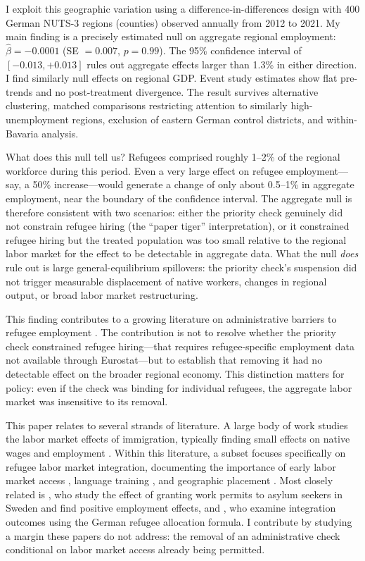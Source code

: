 \documentclass[12pt]{article}
\begin{document}
I exploit this geographic variation using a difference-in-differences design with 400 German NUTS-3 regions (counties) observed annually from 2012 to 2021. My main finding is a precisely estimated null on aggregate regional employment: $\hat{\beta} = -0.0001$ (SE $= 0.007$, $p = 0.99$). The 95\% confidence interval of $[-0.013, +0.013]$ rules out aggregate effects larger than 1.3\% in either direction. I find similarly null effects on regional GDP. Event study estimates show flat pre-trends and no post-treatment divergence. The result survives alternative clustering, matched comparisons restricting attention to similarly high-unemployment regions, exclusion of eastern German control districts, and within-Bavaria analysis.

What does this null tell us? Refugees comprised roughly 1--2\% of the regional workforce during this period. Even a very large effect on refugee employment---say, a 50\% increase---would generate a change of only about 0.5--1\% in aggregate employment, near the boundary of the confidence interval. The aggregate null is therefore consistent with two scenarios: either the priority check genuinely did not constrain refugee hiring (the ``paper tiger'' interpretation), or it constrained refugee hiring but the treated population was too small relative to the regional labor market for the effect to be detectable in aggregate data. What the null \textit{does} rule out is large general-equilibrium spillovers: the priority check's suspension did not trigger measurable displacement of native workers, changes in regional output, or broad labor market restructuring.

This finding contributes to a growing literature on administrative barriers to refugee employment \citep{marbach2018, bratu2023}. The contribution is not to resolve whether the priority check constrained refugee hiring---that requires refugee-specific employment data not available through Eurostat---but to establish that removing it had no detectable effect on the broader regional economy. This distinction matters for policy: even if the check was binding for individual refugees, the aggregate labor market was insensitive to its removal.

This paper relates to several strands of literature. A large body of work studies the labor market effects of immigration, typically finding small effects on native wages and employment \citep{card2012, borjas2003, dustmann2016, foged2016, peri2009}. Within this literature, a subset focuses specifically on refugee labor market integration, documenting the importance of early labor market access \citep{marbach2018}, language training \citep{lochmann2019}, and geographic placement \citep{bansak2018, aksoy2023}. Most closely related is \citet{bratu2023}, who study the effect of granting work permits to asylum seekers in Sweden and find positive employment effects, and \citet{battisti2019}, who examine integration outcomes using the German refugee allocation formula. I contribute by studying a margin these papers do not address: the removal of an administrative check conditional on labor market access already being permitted.
\end{document}
